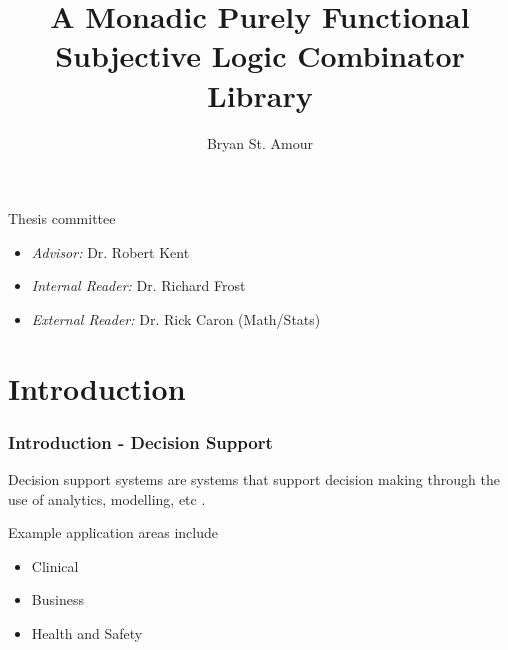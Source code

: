 \documentclass{beamer}
\title{A Monadic Purely Functional Subjective Logic Combinator Library}
\author{Bryan St. Amour}
\begin{document}
%
%

\begin{frame}
\titlepage
\end{frame}

\begin{frame}

Thesis committee

\begin{itemize}
  \item \emph{Advisor:} Dr. Robert Kent
  \item \emph{Internal Reader:} Dr. Richard Frost
  \item \emph{External Reader:} Dr. Rick Caron (Math/Stats)
\end{itemize}

\end{frame}


\begin{frame}
\tableofcontents
\end{frame}


%
%

\section{Introduction}

\begin{frame}
\frametitle{Introduction - Decision Support}

Decision support systems are systems that support decision making
through the use of analytics, modelling, etc \cite{sprague_framework_1980}.

Example application areas include

\begin{itemize}
  \item Clinical \cite{berner2007clinical}
  \item Business \cite{klein_knowledge-based}
  \item Health and Safety \cite{kent2010application}
\end{itemize}

\end{frame}
\end{document}
